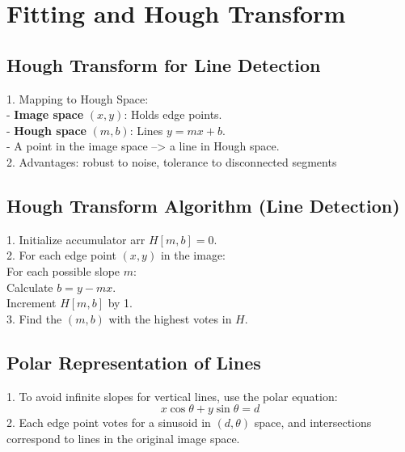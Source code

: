 \section{Fitting and Hough Transform}

\subsection*{Hough Transform for Line Detection}
1. Mapping to Hough Space: \\
   - \textbf{Image space} $(x, y)$: Holds edge points. \\
   - \textbf{Hough space} $(m, b)$: Lines $y = mx + b$. \\
   - A point in the image space --> a line in Hough space. \\
2. Advantages: robust to noise, tolerance to disconnected segments
\subsection*{Hough Transform Algorithm (Line Detection)}
1. Initialize accumulator arr $H[m, b] = 0$. \\
2. For each edge point $(x, y)$ in the image: \\
   \null \quad For each possible slope $m$: \\
   \null \quad \quad Calculate $b = y - mx$. \\
   \null \quad \quad Increment $H[m, b]$ by 1. \\
3. Find the $(m, b)$ with the highest votes in $H$. \\

\subsection*{Polar Representation of Lines}
1. To avoid infinite slopes for vertical lines, use the polar equation: \\
   \[
   x \cos \theta + y \sin \theta = d
   \]
2. Each edge point votes for a sinusoid in $(d, \theta)$ space, and intersections correspond to lines in the original image space.
